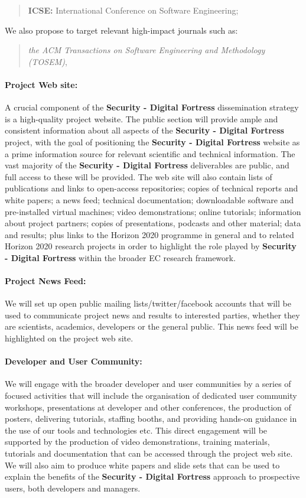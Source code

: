 \documentclass[a4paper,11pt]{article}
\newcommand{\project}[1]{\textbf{#1}\xspace}
\newcommand{\SECURITY}{\project{Security - Digital Fortress}}
\newcommand{\TheProject}{\SECURITY}
\begin{document}
\begin{quote}
\textbf{ICSE:} International Conference on Software Engineering;
 \end{quote}

\noindent
We also propose to target relevant high-impact journals such as:
\begin{quote}
\emph{the ACM Transactions on Software Engineering and Methodology (TOSEM)}, 
\end{quote}

\paragraph{Project Web site:}  
A crucial component of the \TheProject{} dissemination strategy is a
high-quality project website. The public section will provide ample
and consistent information about all aspects of the \TheProject{}
project, with the goal of positioning the \TheProject{} website as a
prime information source for relevant scientific and technical
information.  The vast majority of the \TheProject{} deliverables are
public, and full access to these will be provided.  The web site will also contain lists of publications and links
to open-access repositories; copies of technical reports and white
papers; a news feed; technical documentation; downloadable software
and pre-installed virtual machines; video demonstrations; online
tutorials; information about project partners; copies of
presentations, podcasts and other material; data and results; plus
links to the Horizon 2020 programme in general and to related 
Horizon 2020 research projects in order to highlight the role played by \TheProject{} within the
broader EC research framework.

\paragraph{Project News Feed:}  We will set up open public mailing lists/twitter/facebook accounts that will
be used to communicate project news and results to interested parties, whether they are scientists, academics, developers
or the general public.  This news feed will be highlighted on the project web site.

\paragraph{Developer and User Community:} We will engage with the broader
developer and user communities by a series of focused activities
that will include the organisation of dedicated user community workshops, presentations at
 developer and other conferences, 
 the production of posters, delivering tutorials, staffing booths, and providing hands-on
 guidance in the use of our tools and technologies etc.  This direct engagement will be
 supported by the production of video demonstrations, training materials, tutorials and documentation that can
 be accessed through the project web site.  We will also aim to produce white papers and slide sets that
 can be used to explain the benefits of the \TheProject{} approach to prospective users, both developers
 and managers.
\end{document}
